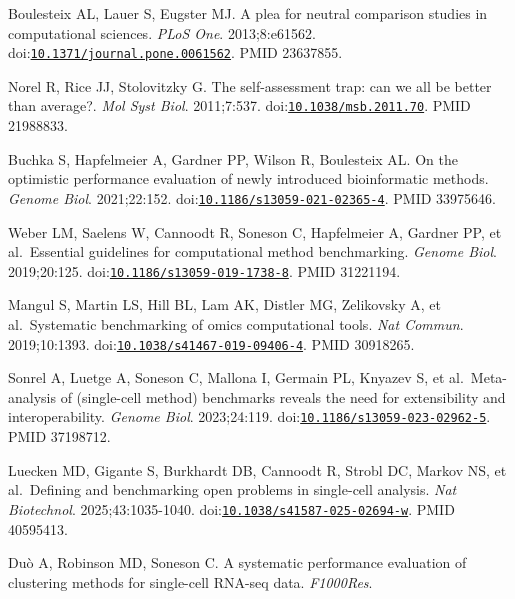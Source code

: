 \documentclass[11pt]{article}
\begin{document}
\begingroup\small{}
\begin{enumerate}[label={[\arabic*]},leftmargin=2.6em,labelsep=0.5em,itemsep=1.5pt]
\item
  Boulesteix AL, Lauer S, Eugster MJ. A plea for neutral comparison
  studies in computational sciences. \emph{PLoS One}. 2013;8:e61562.
  doi:\href{https://doi.org/10.1371/journal.pone.0061562}{\nolinkurl{10.1371/journal.pone.0061562}}.
  PMID 23637855.
\item
  Norel R, Rice JJ, Stolovitzky G. The self-assessment trap: can we all
  be better than average?. \emph{Mol Syst Biol}. 2011;7:537.
  doi:\href{https://doi.org/10.1038/msb.2011.70}{\nolinkurl{10.1038/msb.2011.70}}.
  PMID 21988833.
\item
  Buchka S, Hapfelmeier A, Gardner PP, Wilson R, Boulesteix AL. On the
  optimistic performance evaluation of newly introduced bioinformatic
  methods. \emph{Genome Biol}. 2021;22:152.
  doi:\href{https://doi.org/10.1186/s13059-021-02365-4}{\nolinkurl{10.1186/s13059-021-02365-4}}.
  PMID 33975646.
\item
  Weber LM, Saelens W, Cannoodt R, Soneson C, Hapfelmeier A, Gardner PP,
  et al.~Essential guidelines for computational method benchmarking.
  \emph{Genome Biol}. 2019;20:125.
  doi:\href{https://doi.org/10.1186/s13059-019-1738-8}{\nolinkurl{10.1186/s13059-019-1738-8}}.
  PMID 31221194.
\item
  Mangul S, Martin LS, Hill BL, Lam AK, Distler MG, Zelikovsky A, et
  al.~Systematic benchmarking of omics computational tools. \emph{Nat
  Commun}. 2019;10:1393.
  doi:\href{https://doi.org/10.1038/s41467-019-09406-4}{\nolinkurl{10.1038/s41467-019-09406-4}}.
  PMID 30918265.
\item
  Sonrel A, Luetge A, Soneson C, Mallona I, Germain PL, Knyazev S, et
  al.~Meta-analysis of (single-cell method) benchmarks reveals the need
  for extensibility and interoperability. \emph{Genome Biol}.
  2023;24:119.
  doi:\href{https://doi.org/10.1186/s13059-023-02962-5}{\nolinkurl{10.1186/s13059-023-02962-5}}.
  PMID 37198712.
\item
  Luecken MD, Gigante S, Burkhardt DB, Cannoodt R, Strobl DC, Markov NS,
  et al.~Defining and benchmarking open problems in single-cell
  analysis. \emph{Nat Biotechnol}. 2025;43:1035-1040.
  doi:\href{https://doi.org/10.1038/s41587-025-02694-w}{\nolinkurl{10.1038/s41587-025-02694-w}}.
  PMID 40595413.
\item
  Duò A, Robinson MD, Soneson C. A systematic performance evaluation of
  clustering methods for single-cell RNA-seq data. \emph{F1000Res}.

\end{enumerate}
\end{document}
